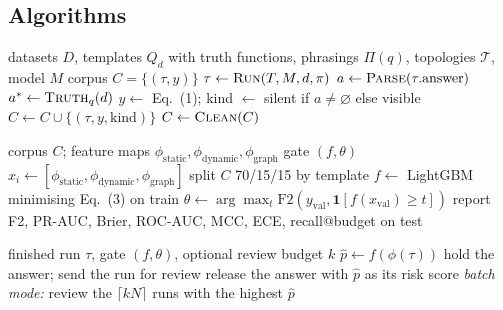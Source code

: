 \documentclass[10pt,twocolumn]{article}
\begin{document}
\subsection{Algorithms}
\begin{algorithm}[H]
\caption{Build the labelled corpus (blocks A, B)}\label{alg:corpus}
\footnotesize
\begin{algorithmic}[1]
\Require datasets $D$, templates $Q_d$ with truth functions, phrasings $\Pi(q)$, topologies $\mathcal{T}$, model $M$
\Ensure corpus $C = \{(\tau, y)\}$
  \State $\tau \gets \textsc{Run}(T, M, d, \pi)$ 
  \State $a \gets \textsc{Parse}(\tau.\text{answer})$
  \State $a^* \gets \textsc{Truth}_q(d)$ 
  \State $y \gets$ Eq.~(1); kind $\gets$ silent if $a \neq \varnothing$ else visible
  \State $C \gets C \cup \{(\tau, y, \text{kind})\}$
\EndFor
\State $C \gets \textsc{Clean}(C)$ 
\end{algorithmic}
\end{algorithm}

\begin{algorithm}[H]
\caption{Train the silent-failure gate (blocks C, D)}\label{alg:gate-train}
\footnotesize
\begin{algorithmic}[1]
\Require corpus $C$; feature maps $\phi_{\text{static}}, \phi_{\text{dynamic}}, \phi_{\text{graph}}$
\Ensure gate $(f, \theta)$
\State $x_i \gets [\phi_{\text{static}}, \phi_{\text{dynamic}}, \phi_{\text{graph}}]$ 
\State split $C$ 70/15/15 by template 
\State $f \gets$ LightGBM minimising Eq.~(3) on train
\State $\theta \gets \arg\max_t \mathrm{F2}(y_{\text{val}}, \mathbf{1}[f(x_{\text{val}}) \ge t])$
\State report F2, PR-AUC, Brier, ROC-AUC, MCC, ECE, recall@budget on test
\end{algorithmic}
\end{algorithm}

\begin{algorithm}[H]
\caption{Gate an answer before it is shown (\texttt{scripts/gate.py})}\label{alg:gate}
\footnotesize
\begin{algorithmic}[1]
\Require finished run $\tau$, gate $(f, \theta)$, optional review budget $k$
\State $\hat{p} \gets f(\phi(\tau))$
 hold the answer; send the run for review
\Else{} release the answer with $\hat{p}$ as its risk score
\EndIf
\State \textit{batch mode:} review the $\lceil kN \rceil$ runs with the highest $\hat{p}$
\end{algorithmic}
\end{algorithm}
\end{document}
